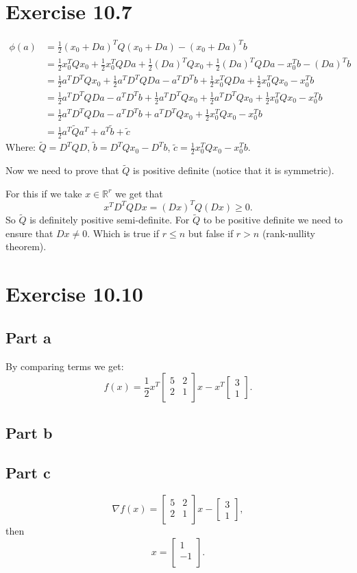 \documentclass{article}
\begin{document}
\section*{Exercise 10.7}
\begin{align*}
	\phi(a)&=\frac{1}{2}(x_0+Da)^TQ(x_0+Da)-(x_0+Da)^Tb\\
	&=\frac{1}{2}x_0^TQx_0+\frac{1}{2}x_0^TQDa+\frac{1}{2}(Da)^TQx_0+\frac{1}{2}(Da)^TQDa -x_0^Tb-(Da)^Tb\\
	&=\frac{1}{2}a^TD^TQx_0+\frac{1}{2}a^TD^TQDa-a^TD^Tb+\frac{1}{2}x_0^TQDa + \frac{1}{2}x_0^TQx_0-x_0^Tb\\
	&=\frac{1}{2}a^TD^TQDa-a^TD^Tb+\frac{1}{2}a^TD^TQx_0+\frac{1}{2}a^TD^TQx_0 + \frac{1}{2}x_0^TQx_0-x_0^Tb\\
	&=\frac{1}{2}a^TD^TQDa-a^TD^Tb+a^TD^TQx_0+ \frac{1}{2}x_0^TQx_0-x_0^Tb\\
	&=\frac{1}{2}a^T\tilde{Q}a^T+a^T\tilde{b}+\tilde{c}
\end{align*}
Where: $\tilde{Q}=D^TQD$, $\tilde{b}=D^TQx_0-D^Tb$, $\tilde{c}=\frac{1}{2}x_0^TQx_0-x_0^Tb$.

Now we need to prove that $\tilde{Q}$ is positive definite (notice that it is symmetric).

For this if we take $x\in\mathbb{R}^r$ we get that
\[
	x^TD^TQDx=(Dx)^TQ(Dx)\geq 0.
\]
So $\tilde{Q}$ is definitely positive semi-definite. For $\tilde{Q}$ to be
positive definite we need to ensure that $Dx\neq 0$. Which is true if $r\leq n$
but false if $r>n$ (rank-nullity theorem).
\section*{Exercise 10.10}
\subsection*{Part a}
By comparing terms we get:
\[
	f(x)=\frac{1}{2}x^T\begin{bmatrix}
	5 & 2 \\
	2 & 1\\
	\end{bmatrix}x
	- x^T\begin{bmatrix}
	3\\
	1
	\end{bmatrix}.
\]
\subsection*{Part b}
\subsection*{Part c}
\[
\nabla f(x)=\begin{bmatrix}
	5 & 2 \\
	2 & 1\\
	\end{bmatrix}x
	- \begin{bmatrix}
	3\\
	1
	\end{bmatrix},
\]
then
\[
	x=\begin{bmatrix}
	1\\
	-1\\
	\end{bmatrix}.
\]
\end{document}
